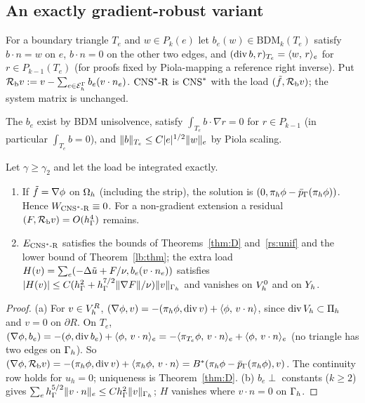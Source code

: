\subsection{An exactly gradient-robust variant}

\begin{definition}[$\CNSR$]\label{rb:def:R}
For a boundary triangle $T_e$ and $w\in P_k(e)$ let $b_e(w)\in\mathrm{BDM}_k(T_e)$ satisfy $b\cdot n=w$ on $e$, $b\cdot n=0$ on the other two edges, and $(\operatorname{div} b,r)_{T_e}=\langle w,\, r\rangle_e$ for $r\in P_{k-1}(T_e)$ (for proofs fixed by Piola-mapping a reference right inverse). Put $\mathcal R_{\mathrm b} v:=v-\sum_{e\in\mathcal E_h^\Gamma}b_e(v\cdot n_e)$. $\CNSR$ is $\mathrm{CNS}^\ast$ with the load $(\tilde f,\mathcal R_{\mathrm b} v)$; the system matrix is unchanged.
\end{definition}

The $b_e$ exist by BDM unisolvence, satisfy $\int_{T_e}b\cdot\nabla r=0$ for $r\in P_{k-1}$ (in particular $\int_{T_e}b=0$), and $\lVert b\rVert_{T_e}\le C|e|^{1/2}\lVert w\rVert_e$ by Piola scaling.

\begin{theorem}\label{rb:R}
Let $\gamma\ge\gamma_2$ and let the load be integrated exactly.
\begin{enumerate}[label=(\alph*)]
\item If $\tilde f=\nabla\phi$ on $\Omega_h$ (including the strip), the solution is $(0,\pi_h\phi-\bar p_{\Gamma}(\pi_h\phi))$. Hence $W_{\mathrm{CNS}^\ast\text{-R}}\equiv0$. For a non-gradient extension a residual $(F,\mathcal R_{\mathrm b} v)=O(h_\Gamma^4)$ remains.
\item $E_{\mathrm{CNS}^\ast\text{-R}}$ satisfies the bounds of Theorems~\ref{thm:D} and~\ref{rs:unif} and the lower bound of Theorem~\ref{lb:thm}; the extra load $H(v)=\sum_e(-\Delta\tilde u+F/\nu,b_e(v\cdot n_e))$ satisfies $|H(v)|\le C(h_\Gamma^2+h_\Gamma^{7/2}\lVert \nabla F\rVert/\nu)\lVert v\rVert_{\Gamma_h}$ and vanishes on $V_h^0$ and on $Y_h$.
\end{enumerate}
\end{theorem}

\begin{proof}
(a) For $v\in V_h^R$, $(\nabla\phi,v)=-(\pi_h\phi,\operatorname{div} v)+\langle \phi,\, v\cdot n\rangle$, since $\operatorname{div}V_h\subset\Pi_h$ and $v=0$ on $\partial R$. On $T_e$, $(\nabla\phi,b_e)=-(\phi,\operatorname{div} b_e)+\langle \phi,\, v\cdot n\rangle_e=-\langle \pi_{T_e}\phi,\, v\cdot n\rangle_e+\langle \phi,\, v\cdot n\rangle_e$ (no triangle has two edges on $\Gamma_h$). So $(\nabla\phi,\mathcal R_{\mathrm b} v)=-(\pi_h\phi,\operatorname{div} v)+\langle \pi_h\phi,\, v\cdot n\rangle=B^\ast(\pi_h\phi-\bar p_{\Gamma}(\pi_h\phi),v)$. The continuity row holds for $u_h=0$; uniqueness is Theorem~\ref{thm:D}. (b) $b_e\perp$ constants ($k\ge2$) gives $\sum_eh_\Gamma^{5/2}\lVert v\cdot n\rVert_e\le Ch_\Gamma^2\lVert v\rVert_{\Gamma_h}$; $H$ vanishes where $v\cdot n=0$ on $\Gamma_h$.
\end{proof}


